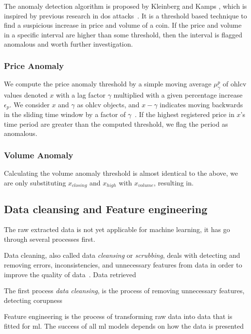 The anomaly detection algorithm is proposed by Kleinberg and Kamps \cite{P&D_to_the_moon}, which is inspired by previous research in \ac{dos} attacks~\cite{dos}. It is a threshold based technique to find a suspicious increase in price and volume of a coin. If the price and volume in a specific interval are higher than some threshold, then the interval is flagged anomalous and worth further investigation.

\subsubsection{Price Anomaly}
We compute the price anomaly threshold by a simple moving average $\mu_\gamma^p$ of \ac{ohlcv} values denoted $x$ with a lag factor $\gamma$ multiplied with a given percentage increase $\epsilon_p$. We consider $x$ and $\gamma$ as \ac{ohlcv} objects, and $x-\gamma$ indicates moving backwards in the sliding time window by a factor of $\gamma$~\cite{P&D_to_the_moon}. If the highest registered price in $x$'s time period are greater than the computed threshold, we flag the period as anomalous.


\subsubsection{Volume Anomaly}
Calculating the volume anomaly threshold is almost identical to the above, we are only substituting $x_{closing}$ and $x_{high}$ with $x_{volume}$, resulting in.  


\subsection{Data cleansing and Feature engineering}
The raw extracted data is not yet applicable for machine learning, it has go through several processes first.


Data cleaning, also called data \emph{cleansing} or \emph{scrubbing}, deals with detecting and removing errors, inconsistencies, and unnecessary features from data in order to improve the quality of data~\cite{data_cleaning}. Data retrieved 



The first process \emph{data cleansing}, is the process of removing unnecessary features, detecting corupness


Feature engineering is the process of transforming raw data into data that is fitted for \ac{ml}. The success of all \ac{ml} models depends on how the data is presented 

